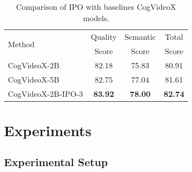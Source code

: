 


% 

\begin{table}[t!]\small
\centering
\vspace{-3mm}
\begin{tabular}{lccc}
\toprule
\multirow{2}{*}{Method} & Quality & Semantic & Total \\
& Score & Score & Score \\
\midrule
CogVideoX-2B & 82.18 & 75.83 & 80.91 \\
CogVideoX-5B & 82.75 & 77.04 & 81.61 \\
CogVideoX-2B-IPO-3 & \textbf{83.92} & \textbf{78.00} & \textbf{82.74} \\
\bottomrule
\end{tabular}
\vspace{-2mm}
\caption{Comparison of IPO with baselines CogVideoX models.}
\label{sota_comparison}
\end{table}




\section{Experiments}



%




\subsection{Experimental Setup}


